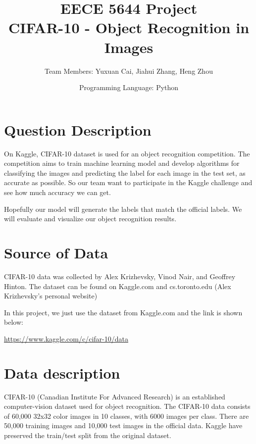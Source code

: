 \documentclass{article}
\begin{document}
\title{EECE 5644 Project\\CIFAR-10 - Object Recognition in Images}

\author{Team Members: Yuxuan Cai, Jiahui Zhang, Heng Zhou}
\date{Programming Language: Python}
\maketitle

\section{Question Description}

\hspace{1.5em}On Kaggle, CIFAR-10 dataset is used for an object recognition competition. The competition aims to train machine learning model and develop algorithms for classifying the images and predicting the label for each image in the test set, as accurate as possible. So our team want to participate in the Kaggle challenge and see how much accuracy we can get. 

Hopefully our model will generate the labels that match the official labels. We will evaluate and visualize our object recognition results. 

\section{Source of Data}
CIFAR-10 data was collected by Alex Krizhevsky, Vinod Nair, and Geoffrey Hinton. The dataset can be found on Kaggle.com and cs.toronto.edu (Alex Krizhevsky's personal website)

In this project, we just use the dataset from Kaggle.com and the link is shown below:

\url{https://www.kaggle.com/c/cifar-10/data}

\section{Data description}
CIFAR-10 (Canadian Institute For Advanced Research) is an established computer-vision dataset used for object recognition. The CIFAR-10 data consists of 60,000 32x32 color images in 10 classes, with 6000 images per class. There are 50,000 training images and 10,000 test images in the official data. Kaggle have preserved the train/test split from the original dataset. 
\end{document}
